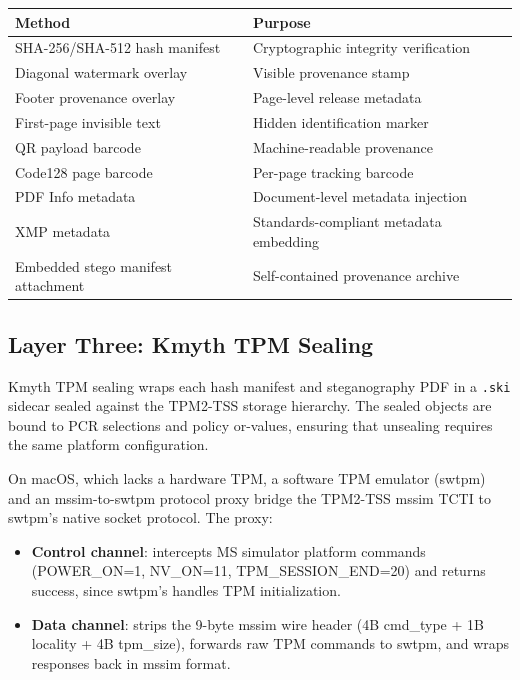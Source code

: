 \documentclass[
]{article}
\newcounter{none} %
\providecommand{\tightlist}{%
  \setlength{\itemsep}{0pt}\setlength{\parskip}{0pt}}
\begin{document}
{\def\LTcaptype{none} %
\begin{longtable}[]{@{}
  >{\raggedright\arraybackslash}p{}
  >{\raggedright\arraybackslash}p{}@{}}
\toprule\noalign{}
\begin{minipage}[b]{\linewidth}\raggedright
Method
\end{minipage} & \begin{minipage}[b]{\linewidth}\raggedright
Purpose
\end{minipage} \\
\midrule\noalign{}
\endhead
\bottomrule\noalign{}
\endlastfoot
SHA-256/SHA-512 hash manifest & Cryptographic integrity verification \\
Diagonal watermark overlay & Visible provenance stamp \\
Footer provenance overlay & Page-level release metadata \\
First-page invisible text & Hidden identification marker \\
QR payload barcode & Machine-readable provenance \\
Code128 page barcode & Per-page tracking barcode \\
PDF Info metadata & Document-level metadata injection \\
XMP metadata & Standards-compliant metadata embedding \\
Embedded stego manifest attachment & Self-contained provenance
archive \\
\end{longtable}
}

\subsection{Layer Three: Kmyth TPM
Sealing}\label{layer-three-kmyth-tpm-sealing}

Kmyth TPM sealing wraps each hash manifest and steganography PDF in a
\texttt{.ski} sidecar sealed against the TPM2-TSS storage hierarchy. The
sealed objects are bound to PCR selections and policy or-values,
ensuring that unsealing requires the same platform configuration.

On macOS, which lacks a hardware TPM, a software TPM emulator (swtpm)
and an mssim-to-swtpm protocol proxy bridge the TPM2-TSS mssim TCTI to
swtpm's native socket protocol. The proxy:

\begin{itemize}
\tightlist
\item
  \textbf{Control channel}: intercepts MS simulator platform commands
  (POWER\_ON=1, NV\_ON=11, TPM\_SESSION\_END=20) and returns success,
  since swtpm's  handles TPM
  initialization.
\item
  \textbf{Data channel}: strips the 9-byte mssim wire header (4B
  cmd\_type + 1B locality + 4B tpm\_size), forwards raw TPM commands to
  swtpm, and wraps responses back in mssim format.
\end{itemize}
\end{document}

